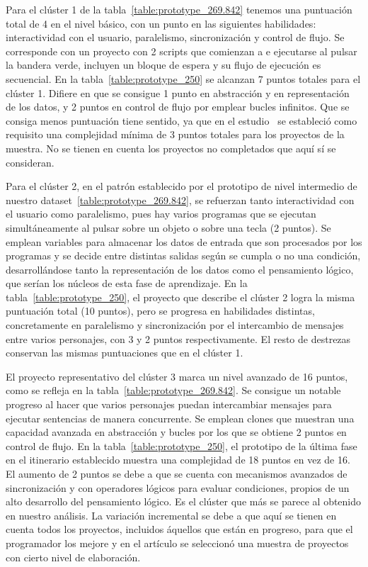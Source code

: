 \documentclass[a4paper, 12pt]{book}
\begin{document}
Para el clúster 1 de la tabla~\ref{table:prototype_269.842} tenemos una puntuación total de 4 en el nivel básico, con un punto en las siguientes habilidades: interactividad con el usuario, paralelismo, sincronización y control de flujo. Se corresponde con un proyecto con 2 scripts que comienzan a e ejecutarse al pulsar la bandera verde, incluyen un bloque de espera y su flujo de ejecución es secuencial. En la tabla~\ref{table:prototype_250} se alcanzan 7 puntos totales para el clúster 1. Difiere en que se consigue 1 punto en abstracción y en representación de los datos, y 2 puntos en control de flujo por emplear bucles infinitos. Que se consiga menos puntuación tiene sentido, ya que en el estudio~\cite{moreno17:_paths} se estableció como requisito una complejidad mínima de 3 puntos totales para los proyectos de la muestra. No se tienen en cuenta los proyectos no completados que aquí sí se consideran.

Para el clúster 2, en el patrón establecido por el prototipo de nivel intermedio de nuestro dataset~\ref{table:prototype_269.842}, se refuerzan tanto interactividad con el usuario como paralelismo, pues hay varios programas que se ejecutan simultáneamente al pulsar sobre un objeto o sobre una tecla (2 puntos). Se emplean variables para almacenar los datos de entrada que son procesados por los programas y se decide entre distintas salidas según se cumpla o no una condición, desarrollándose tanto la representación de los datos como el pensamiento lógico, que serían los núcleos de esta fase de aprendizaje.
En la tabla~\ref{table:prototype_250}, el proyecto que describe el clúster 2 logra la misma puntuación total (10 puntos), pero se progresa en habilidades distintas, concretamente en paralelismo y sincronización por el intercambio de mensajes entre varios personajes, con 3 y 2 puntos respectivamente. El resto de destrezas conservan las mismas puntuaciones que en el clúster 1.

El proyecto representativo del clúster 3 marca un nivel avanzado de 16 puntos, como se refleja en la tabla~\ref{table:prototype_269.842}. Se consigue un notable progreso al hacer que varios personajes puedan intercambiar mensajes para ejecutar sentencias de manera concurrente. Se emplean clones que muestran una capacidad avanzada en abstracción y bucles por los que se obtiene 2 puntos en control de flujo. En la tabla~\ref{table:prototype_250}, el prototipo de la última fase en el itinerario establecido muestra una complejidad de 18 puntos en vez de 16. El aumento de 2 puntos se debe a que se cuenta con mecanismos avanzados de sincronización y con operadores lógicos para evaluar condiciones, propios de un alto desarrollo del pensamiento lógico. Es el clúster que más se parece al obtenido en nuestro análisis. La variación incremental se debe a que aquí se tienen en cuenta todos los proyectos, incluidos áquellos que están en progreso, para que el programador los mejore y en el artículo se seleccionó una muestra de proyectos con cierto nivel de elaboración.
\end{document}
